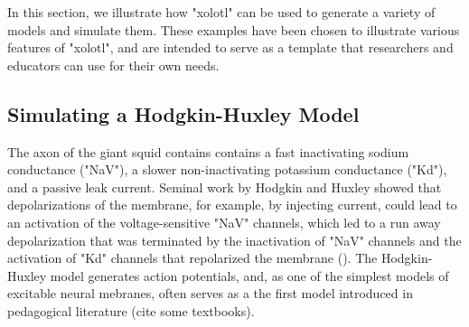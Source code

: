 \documentclass{frontiersSCNS} %
\begin{document}
In this section, we illustrate how "xolotl" can be used to generate a variety of models and simulate them. These examples have been chosen to illustrate various features of "xolotl", and are intended to serve as a template that researchers and educators can use for their own needs. 

%
%
%
%
%
%

\subsection{Simulating a Hodgkin-Huxley Model}

The axon of the giant squid contains contains a fast inactivating sodium conductance ("NaV"), a slower non-inactivating potassium conductance ("Kd"), and a passive leak current. Seminal work by Hodgkin and Huxley showed that depolarizations of the membrane, for example, by injecting current, could lead to an activation of the voltage-sensitive "NaV" channels, which led to a run away depolarization that was terminated by the inactivation of "NaV" channels and the activation of "Kd" channels that repolarized the membrane (\cite{hodgkinComponentsMembraneConductance1952, hodgkinMeasurementCurrentvoltageRelations1952}). The Hodgkin-Huxley model generates action potentials, and, as one of the simplest models of excitable neural mebranes, often serves as a the first model introduced in pedagogical literature (cite some textbooks).  
\end{document}
